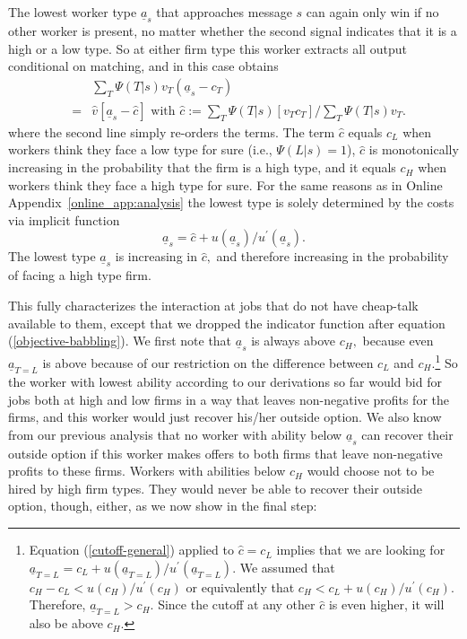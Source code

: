 \documentclass[12pt]{article}
\begin{document}
The lowest worker type $\underline{a}_{s}$ that approaches message $s$ can
again only win if no other worker is present, no matter whether the second
signal indicates that it is a high or a low type. So at either firm type
this worker extracts all output conditional on matching, and in this case
obtains 
\begin{eqnarray*}
&&\sum_{T}\Psi (T|s)v_{T}(\underline{a}_{s}-c_{T}) \\
&=&\widehat{v}[\underline{a}_{s}-\widehat{c}]\text{ with }\widehat{c}%
:=\sum_{T}\Psi (T|s)[v_{T}c_{T}]/\sum_{T}\Psi (T|s)v_{T}.
\end{eqnarray*}%
where the second line simply re-orders the terms. The term $\widehat{c}$
equals $c_{L}$ when workers think they face a low type for sure (i.e., $\Psi
(L|s)=1$), $\widehat{c}$ is monotonically increasing in the probability that
the firm is a high type, and it equals $c_{H}$ when workers think they face
a high type for sure. For the same reasons as in Online Appendix~\ref{online_app:analysis}
the lowest type is solely determined by the costs via implicit function 
\begin{equation}
\underline{a}_{s}=\widehat{c}+u(\underline{a}_{s})/u^{\prime }(\underline{a}%
_{s}).  \label{cutoff-general}
\end{equation}%
The lowest type $\underline{a}_{s}$ is increasing in $\widehat{c},$ and
therefore increasing in the probability of facing a high type firm.

This fully characterizes the interaction at jobs that do not have cheap-talk
available to them, except that we dropped the indicator function after
equation (\ref{objective-babbling}). We first note that $\underline{a}_{s}$
is always above $c_{H},$ because even $\underline{a}_{T=L}$ is above because
of our restriction on the difference between $c_{L}$ and $c_{H}.$\footnote{%
Equation (\ref{cutoff-general}) applied to $\widehat{c}=c_{L}$ implies that
we are looking for $\underline{a}_{T=L}=c_{L}+u(\underline{a}%
_{T=L})/u^{\prime }(\underline{a}_{T=L}).$ We assumed that $%
c_{H}-c_{L}<u(c_{H})/u^{\prime }(c_{H})$ or equivalently that $%
c_{H}<c_{L}+u(c_{H})/u^{\prime }(c_{H}).$ Therefore, $\underline{a}%
_{T=L}>c_{H}.$ Since the cutoff at any other $\widehat{c}$ is even higher, it
will also be above $c_{H}.$} So the worker with lowest ability according to
our derivations so far would bid for jobs both at high and low firms in a
way that leaves non-negative profits for the firms, and this worker would
just recover his/her outside option. We also know from our previous analysis
that no worker with ability below $\underline{a}_{s}$ can recover their
outside option if this worker makes offers to both firms that leave
non-negative profits to these firms. Workers with abilities below $c_{H}$
would choose not to be hired by high firm types. They would never be able to
recover their outside option, though, either, as we now show in the final
step:
\end{document}
